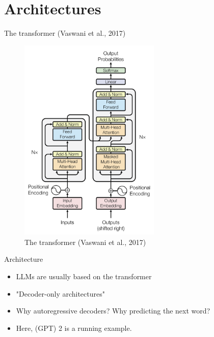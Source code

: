 \documentclass[10pt]{beamer}
\begin{document}
\section{Architectures}
\frame{\sectionpage}

\begin{frame}{The transformer (Vaswani et al., 2017)}

\begin{figure}[h]
\centering
\includegraphics[width=0.6\textwidth]{fig/Vaswani_1_transformer}
\caption{The transformer (Vaswani et al., 2017)}
\end{figure}

\end{frame}


\begin{frame}{Architecture}

\begin{itemize}
\item LLMs are usually based on the transformer 
\item "Decoder-only architectures"\pause
\item Why autoregressive decoders? Why predicting the next word?\pause
\item Here,  (GPT) 2 is a running example.
\end{itemize}

\end{frame}
\end{document}
